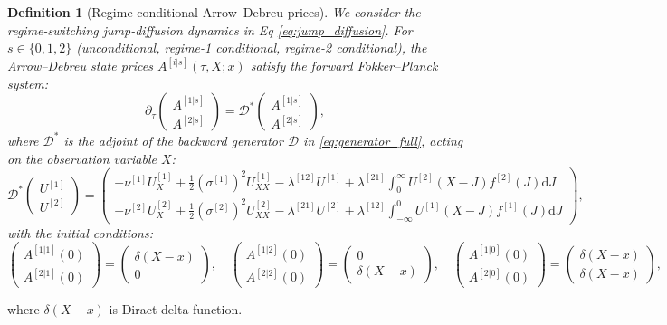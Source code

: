 \documentclass[11pt,a4paper]{article}
\numberwithin{equation}{section}
\newtheorem{definition}[theorem]{Definition}
\newcommand{\dd}{\mathrm{d}}
\begin{document}
\begin{definition}[Regime-conditional Arrow--Debreu prices]\label{def:ad}
We consider the regime-switching jump-diffusion dynamics in Eq \ref{eq:jump_diffusion}.
For $s \in \{0,1,2\}$ (unconditional, regime-1 conditional, regime-2 conditional), the Arrow--Debreu state prices $A^{[i|s]}(\tau, X; x)$ satisfy the forward Fokker--Planck system:
\begin{equation}\label{eq:ad_system}
\partial_\tau \begin{pmatrix} A^{[1|s]} \\ A^{[2|s]} \end{pmatrix} = \mathcal{D}^* \begin{pmatrix} A^{[1|s]} \\ A^{[2|s]} \end{pmatrix},
\end{equation}
where $\mathcal{D}^*$ is the adjoint of the backward generator $\mathcal{D}$ in \eqref{eq:generator_full}, acting on the observation variable $X$:
\begin{equation}\label{eq:forward_generator}
\mathcal{D}^* \begin{pmatrix} U^{[1]} \\ U^{[2]} \end{pmatrix} =
\begin{pmatrix}
-\nu^{[1]} U^{[1]}_X + \tfrac{1}{2}(\sigma^{[1]})^2 U^{[1]}_{XX} - \lambda^{[12]} U^{[1]} + \lambda^{[21]} \displaystyle\int_{0}^{\infty} U^{[2]}(X-J) f^{[2]}(J) \dd J \\[6pt]
-\nu^{[2]} U^{[2]}_X + \tfrac{1}{2}(\sigma^{[2]})^2 U^{[2]}_{XX} - \lambda^{[21]} U^{[2]} + \lambda^{[12]} \displaystyle\int_{-\infty}^{0} U^{[1]}(X-J) f^{[1]}(J) \dd J
\end{pmatrix},
\end{equation}
with the initial conditions:
\begin{equation}\label{eq:ad_ic}
\begin{pmatrix} A^{[1|1]}(0) \\ A^{[2|1]}(0) \end{pmatrix} = \begin{pmatrix} \delta(X-x) \\ 0 \end{pmatrix}, \quad
\begin{pmatrix} A^{[1|2]}(0) \\ A^{[2|2]}(0) \end{pmatrix} = \begin{pmatrix} 0 \\ \delta(X-x) \end{pmatrix}, \quad
\begin{pmatrix} A^{[1|0]}(0) \\ A^{[2|0]}(0) \end{pmatrix} = \begin{pmatrix} \delta(X-x) \\ \delta(X-x) \end{pmatrix},
\end{equation}
\end{definition}
where $\delta(X-x)$ is Diract delta function.
\end{document}
